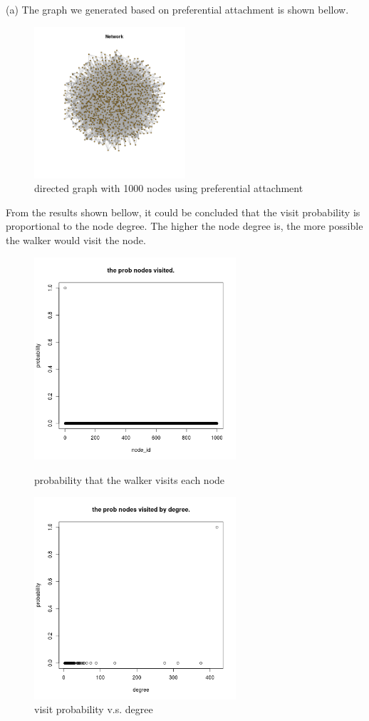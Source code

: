 \documentclass[draftcls,12pt,onecolumn]{IEEEtran}
\begin{document}
(a) The graph we generated based on preferential attachment is shown bellow. 
\begin{figure}[H]
\centering
\includegraphics[width=0.5\textwidth]{3_network.png}
\caption{directed graph with 1000 nodes using preferential attachment }
\end{figure}
From the results shown bellow, it could be concluded that the visit probability is proportional to the node degree. The higher the node degree is, the more possible the walker would visit the node.
\begin{figure}[htbp]
\centering
\begin{minipage}[t]{0.48\textwidth}
\centering
\includegraphics[width=7.5cm]{3_a_rw_prob.png}
\caption{probability that the walker visits each node}
\end{minipage}
\begin{minipage}[t]{0.48\textwidth}
\centering
\includegraphics[width=7.5cm]{3_a_rw_prob_by_degree.png}
\caption{visit probability v.s. degree}
\end{minipage}
\end{figure}
\end{document}
